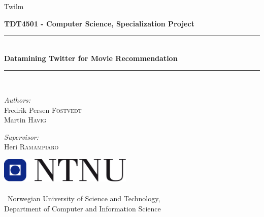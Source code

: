 \documentclass[10pt,a4paper,oneside]{report}
\newcommand{\HRule}{\rule{\linewidth}{0.5mm}}
\begin{document}
\thispagestyle{empty}
\begin{center}
	{\Huge Twilm} \\
	\medskip

    { \Large \bfseries TDT4501 - Computer Science, Specialization Project}
    \HRule \\[0.5cm]
	{ \huge \bfseries Datamining Twitter for Movie Recommendation \\[0.4cm]}

    \HRule \\[0.5cm]

    \begin{minipage}{0.4\textwidth}
        \begin{flushleft} \large
            \emph{Authors:}\\
            Fredrik Persen \textsc{Fostvedt} \\
            Martin \textsc{Havig}
        \end{flushleft}
    \end{minipage}
    \begin{minipage}{0.4\textwidth}
        \begin{flushright} \large
            \emph{Supervisor:} \\
            Heri  \textsc{Ramampiaro}
        \end{flushright}
    \end{minipage}

    \vfill
    \includegraphics[width=2.5in]{image/logo_NTNU.png} \\\ \\\
    {\Large Norwegian University of Science and Technology, \\
    Department of Computer and Information Science} \\
\end{center}
\newpage
\end{document}
